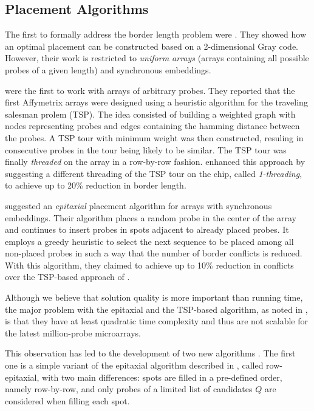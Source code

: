 \documentclass{bioinfo}
\begin{document}
\subsection{Placement Algorithms}

The first to formally address the border length problem were \citealp{FELDMAN93}. They showed how an optimal placement can be constructed based on a 2-dimensional Gray code. However, their work is restricted to \emph{uniform arrays} (arrays containing all possible probes of a given length) and synchronous embeddings.

\citealp{HANNENHALLI02} were the first to work with arrays of arbitrary probes. They reported that the first Affymetrix arrays were designed using a heuristic algorithm for the traveling salesman prolem (TSP). The idea consisted of building a weighted graph with nodes representing probes and edges containing the hamming distance between the probes. A TSP tour with minimum weight was then constructed, resuling in consecutive probes in the tour being likely to be similar. The TSP tour was finally \emph{threaded} on the array in a row-by-row fashion. \citealp{HANNENHALLI02} enhanced this approach by suggesting a different threading of the TSP tour on the chip, called \emph{1-threading}, to achieve up to 20\% reduction in border length.

\citealp{KAHNG02} suggested an \emph{epitaxial} placement algorithm for arrays with synchronous embeddings. Their algorithm places a random probe in the center of the array and continues to insert probes in spots adjacent to already placed probes. It employs a greedy heuristic to select the next sequence to be placed among all non-placed probes in such a way that the number of border conflicts is reduced. With this algorithm, they claimed to achieve up to 10\% reduction in conflicts over the TSP-based approach of \citealp{HANNENHALLI02}.

Although we believe that solution quality is more important than running time, the major problem with the epitaxial and the TSP-based algorithm, as noted in \citealp{KAHNG03_1}, is that they have at least quadratic time complexity and thus are not scalable for the latest million-probe microarrays.

This observation has led to the development of two new algorithms \citep{KAHNG03_1}. The first one is a simple variant of the epitaxial algorithm described in \citealp{KAHNG02}, called row-epitaxial, with two main differences: spots are filled in a pre-defined order, namely row-by-row, and only probes of a limited list of candidates $Q$ are considered when filling each spot.
\end{document}
